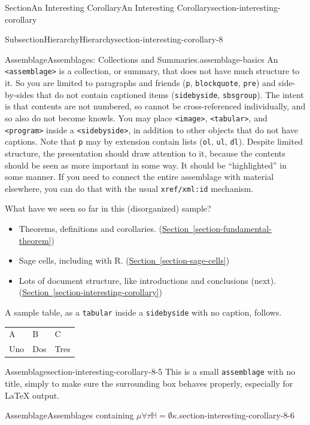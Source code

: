 \documentclass[twoside,10pt,]{article}
\newcommand{\tabularfont}{\relax}
\newcommand{\xreffont}{\relax}
\newcommand{\mono}[1]{\texttt{#1}}
\numberwithin{equation}{section}
\begin{document}
\begin{sectionptx}{Section}{An Interesting Corollary}{}{An Interesting Corollary}{}{}{section-interesting-corollary}
\begin{subsectionptx}{Subsection}{Hierarchy}{}{Hierarchy}{}{}{section-interesting-corollary-8}
\begin{assemblage}{Assemblage}{Assemblages: Collections and Summaries.}{assemblage-basics}
An \mono{<assemblage>} is a collection, or summary, that does not have much structure to it.  So you are limited to paragraphs and friends (\mono{p}, \mono{blockquote}, \mono{pre}) and side-by-sides that do not contain captioned items (\mono{sidebyside}, \mono{sbsgroup}).  The intent is that contents are not numbered, so cannot be cross-referenced individually, and so also do not become knowls.  You may place \mono{<image>}, \mono{<tabular>}, and \mono{<program>} inside a \mono{<sidebyside>}, in addition to other objects that do not have captions.  Note that \mono{p} may by extension contain lists (\mono{ol}, \mono{ul}, \mono{dl}).  Despite limited structure, the presentation should draw attention to it, because the contents should be seen as more important in some way.  It should be ``highlighted'' in some manner.  If you need to connect the entire assemblage with material elsewhere, you can do that with the usual \mono{xref/xml:id} mechanism.%
\par
What have we seen so far in this (disorganized) sample?%
\begin{itemize}[label=\textbullet]
\item{}Theorems, definitions and corollaries. (\hyperref[section-fundamental-theorem]{Section~{\xreffont\ref{section-fundamental-theorem}}})%
\item{}Sage cells, including with R. (\hyperref[section-sage-cells]{Section~{\xreffont\ref{section-sage-cells}}})%
\item{}Lots of document structure, like introductions and conclusions (next). (\hyperref[section-interesting-corollary]{Section~{\xreffont\ref{section-interesting-corollary}}})%
\end{itemize}
%
\par
A sample table, as a \mono{tabular} inside a \mono{sidebyside} with no caption, follows.%
\begin{center}%
{\tabularfont%
\begin{tabular}{lll}
A&B&C\tabularnewline[0pt]
Uno&Dos&Tres
\end{tabular}
}%
\end{center}%
\end{assemblage}
\begin{assemblage}{Assemblage}{}{section-interesting-corollary-8-5}%
This is a small \mono{assemblage} with no title, simply to make sure the surrounding box behaves properly, especially for \LaTeX{} output.%
\end{assemblage}
\begin{assemblage}{Assemblage}{Assemblages containing \(\mu \forall \tau \mathbb{H} = \emptyset \kappa\).}{section-interesting-corollary-8-6}%

\end{assemblage}
\end{subsectionptx}
\end{sectionptx}
\end{document}
